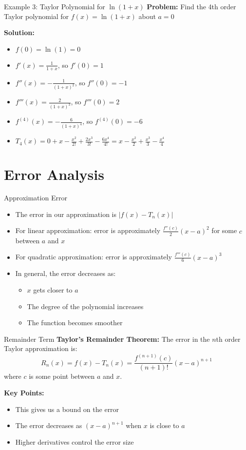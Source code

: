 \documentclass[aspectratio=169]{beamer}
\begin{document}
\begin{frame}{Example 3: Taylor Polynomial for $\ln(1+x)$}
\textbf{Problem:} Find the 4th order Taylor polynomial for $f(x) = \ln(1+x)$ about $a = 0$

\textbf{Solution:}
\begin{itemize}
    \item $f(0) = \ln(1) = 0$
    \item $f'(x) = \frac{1}{1+x}$, so $f'(0) = 1$
    \item $f''(x) = -\frac{1}{(1+x)^2}$, so $f''(0) = -1$
    \item $f'''(x) = \frac{2}{(1+x)^3}$, so $f'''(0) = 2$
    \item $f^{(4)}(x) = -\frac{6}{(1+x)^4}$, so $f^{(4)}(0) = -6$
    \item $T_4(x) = 0 + x - \frac{x^2}{2!} + \frac{2x^3}{3!} - \frac{6x^4}{4!} = x - \frac{x^2}{2} + \frac{x^3}{3} - \frac{x^4}{4}$
\end{itemize}
\end{frame}

\section{Error Analysis}

\begin{frame}{Approximation Error}
\begin{itemize}
    \item The error in our approximation is $|f(x) - T_n(x)|$
    \item For linear approximation: error is approximately $\frac{f''(c)}{2}(x-a)^2$ for some $c$ between $a$ and $x$
    \item For quadratic approximation: error is approximately $\frac{f'''(c)}{6}(x-a)^3$
    \item In general, the error decreases as:
    \begin{itemize}
        \item $x$ gets closer to $a$
        \item The degree of the polynomial increases
        \item The function becomes smoother
    \end{itemize}
\end{itemize}
\end{frame}

\begin{frame}{Remainder Term}
\textbf{Taylor's Remainder Theorem:}
The error in the $n$th order Taylor approximation is:
\[R_n(x) = f(x) - T_n(x) = \frac{f^{(n+1)}(c)}{(n+1)!}(x-a)^{n+1}\]
where $c$ is some point between $a$ and $x$.

\textbf{Key Points:}
\begin{itemize}
    \item This gives us a bound on the error
    \item The error decreases as $(x-a)^{n+1}$ when $x$ is close to $a$
    \item Higher derivatives control the error size
\end{itemize}
\end{frame}
\end{document}
